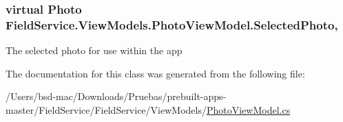 \hypertarget{class_field_service_1_1_view_models_1_1_photo_view_model_a2a9f8118255a37dffffdcd53e9528356}{
\subsubsection[{Selected\+Photo}]{\setlength{\rightskip}{0pt plus 5cm}virtual {\bf Photo} Field\+Service.\+View\+Models.\+Photo\+View\+Model.\+Selected\+Photo\hspace{0.3cm}{\ttfamily [get]}, {\ttfamily [set]}}}\label{class_field_service_1_1_view_models_1_1_photo_view_model_a2a9f8118255a37dffffdcd53e9528356}


The selected photo for use within the app 



The documentation for this class was generated from the following file\+:\begin{DoxyCompactItemize}
\item 
/\+Users/bsd-\/mac/\+Downloads/\+Pruebas/prebuilt-\/apps-\/master/\+Field\+Service/\+Field\+Service/\+View\+Models/\hyperlink{_view_models_2_photo_view_model_8cs}{Photo\+View\+Model.\+cs}\end{DoxyCompactItemize}
